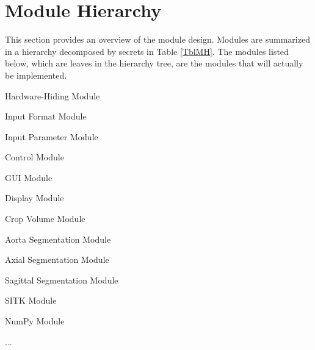 \documentclass[12pt, titlepage]{article}
\newcounter{mnum}
\newcommand{\mthemnum}{M\themnum}
\begin{document}
\section{Module Hierarchy} \label{SecMH}

This section provides an overview of the module design. Modules are summarized
in a hierarchy decomposed by secrets in Table \ref{TblMH}. The modules listed
below, which are leaves in the hierarchy tree, are the modules that will
actually be implemented.

\begin{description}
\item [ \mthemnum \label{mHH}:] Hardware-Hiding Module
\item [ \mthemnum \label{mInput}:] Input Format Module
\item [ \mthemnum \label{mParams}:] Input Parameter Module
\item [ \mthemnum \label{mControl}:] Control Module
\item [ \mthemnum \label{mGUI}:] GUI Module
\item [ \mthemnum \label{mDisplay}:] Display Module
\item [ \mthemnum \label{mROI}:] Crop Volume Module
\item [ \mthemnum \label{mAortaSeg}:] Aorta Segmentation Module
\item [ \mthemnum \label{mAS}:] Axial Segmentation Module
\item [ \mthemnum \label{mSS}:] Sagittal Segmentation Module
\item [ \mthemnum \label{mSITK}:] SITK Module
\item [ \mthemnum \label{mNP}:] NumPy Module
\item ...
\end{description}
\end{document}
